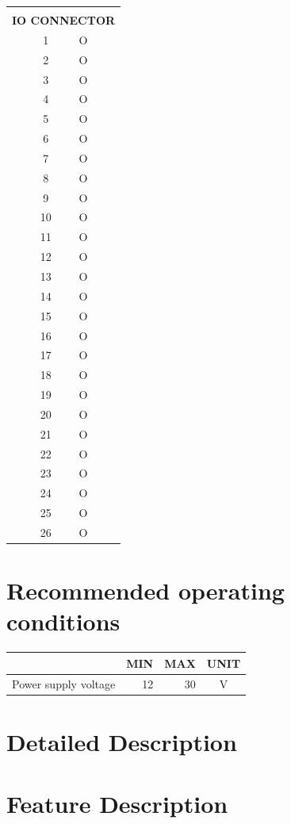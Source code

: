 \documentclass{article}
\begin{document}
\begin{table}[H]
\begin{tabularx}{\textwidth}{|l|c|c|X|}
\hline
\multicolumn{4}{|l|}{} \\
\multicolumn{4}{|l|}{\textbf{IO CONNECTOR}} \\ \hline
 & 1 & O &  \\ \hline
 & 2 & O &  \\ \hline
 & 3 & O &  \\ \hline
 & 4 & O &  \\ \hline
 & 5 & O &  \\ \hline
 & 6 & O &  \\ \hline
 & 7 & O &  \\ \hline
 & 8 & O &  \\ \hline
 & 9 & O &  \\ \hline
 & 10 & O &  \\ \hline
 & 11 & O &  \\ \hline
 & 12 & O &  \\ \hline
 & 13 & O &  \\ \hline
 & 14 & O &  \\ \hline
 & 15 & O &  \\ \hline
 & 16 & O &  \\ \hline
 & 17 & O &  \\ \hline
 & 18 & O &  \\ \hline
 & 19 & O &  \\ \hline
 & 20 & O &  \\ \hline
 & 21 & O &  \\ \hline
 & 22 & O &  \\ \hline
 & 23 & O &  \\ \hline
 & 24 & O &  \\ \hline
 & 25 & O &  \\ \hline
 & 26 & O &  \\ \hline

\end{tabularx}
\label{table:io}
\end{table}

\section{Recommended operating conditions}
\begin{table}[H]
\begin{tabularx}{\textwidth}{|X|r r|c|}
\hline
\rowcolor{lightgray}         & MIN     & MAX     & UNIT \\ \hline
Power supply voltage         & 12      & 30      & V    \\ \hline
\end{tabularx}
\label{table:abs}
\end{table}

\section{Detailed Description}
\lipsum[1-2]

\section{Feature Description}
\lipsum[1-2]
\end{document}
